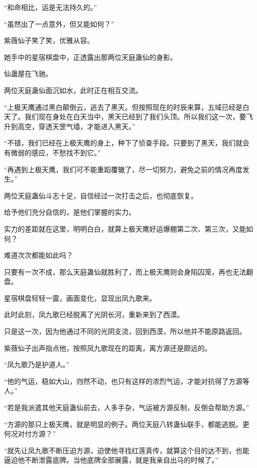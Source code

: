 
\begin{this_body}

“和命相比，运是无法持久的。”

“虽然出了一点意外，但又能如何？”

紫薇仙子笑了笑，优雅从容。

她手中的星宿棋盘中，正透露出那两位天庭蛊仙的身影。

仙蛊屋在飞驰。

两位天庭蛊仙面沉如水，此时正在相互交流。

“上极天鹰通过黑白颠倒云，逃去了黑天。但按照现在的时辰来算，五域已经是白天了。我们现在身处在白天当中，黑天已经到了我们头顶。所以我们这一次，要飞升到高空，穿透天罡气墙，才能进入黑天。”

“不错，我们已经在上极天鹰的身上，种下了侦查手段。只要到了黑天，我们就会有微弱的感应，不愁找不到它。”

“再遇到上极天鹰，我们可不能重蹈覆辙了，尽一切努力，避免之前的情况再度发生。”

两位天庭蛊仙斗志十足，自信经过一次打击之后，也彻底恢复。

给予他们充分自信的，是他们掌握的实力。

实力的差距就在这里，明明白白，就算上极天鹰好运爆棚第二次、第三次，又能如何？

难道次次都能如此吗？

只要有一次不成，那么天庭蛊仙就胜利了，而上极天鹰则会身陷囚笼，再也无法翻盘。

星宿棋盘轻轻一震，画面变化，显现出凤九歌来。

此时此刻，凤九歌已经脱离了光阴长河，重新来到了西漠。

只是这一次，因为他通过不同的光阴支流，回到西漠，所以他并不能原路返回。

紫薇仙子出声指点他，按照凤九歌现在的距离，离方源还是颇远的。

“凤九歌乃是护道人。”

“他的气运，稳如大山，岿然不动，也只有这样的浓烈气运，才能对抗得了方源等人。”

“若是我派遣其他天庭蛊仙前去，人多手杂，气运被方源反制，反倒会帮助方源。”

“方源的那只上极天鹰，就是明显的例子。两位天庭八转蛊仙联手，都能逃脱。更何况对付方源？”

“就先让凤九歌不断压迫方源，迫使他寻找红莲真传，就算这个目的达不到，也能逼迫他不断泄露底牌。当他底牌全部展露，就是我亲自出马的时候了。”


\end{this_body}
